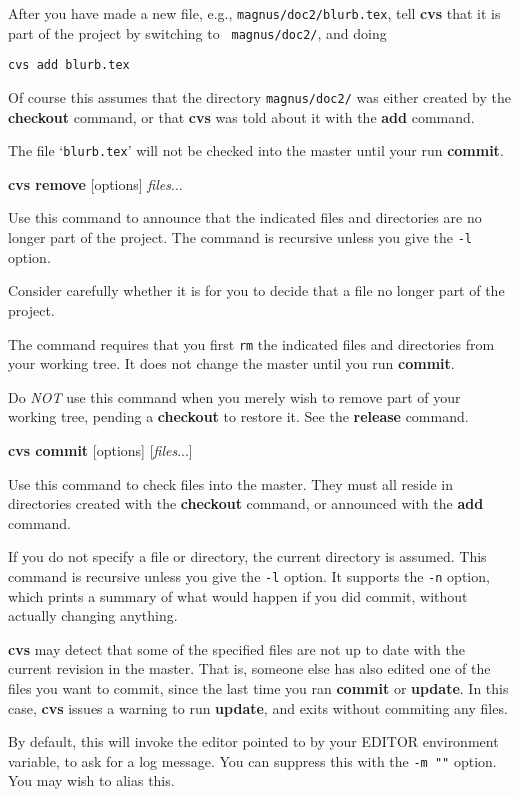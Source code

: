 \begin{description}
After you have made a new file, e.g., {\tt magnus/doc2/blurb.tex}, tell
{\bf cvs} that it is part of the project by switching to {\tt
magnus/doc2/}, and doing

\vspace{8pt}

{\tt cvs add blurb.tex}

\vspace{8pt}

Of course this assumes that the directory {\tt magnus/doc2/} was
either created by the {\bf checkout} command, or that {\bf cvs} was
told about it with the {\bf add} command.

The file `{\tt blurb.tex}' will not be checked into the master until
your run {\bf commit}.



\item{{\bf cvs remove} [options] {\em files}...}

Use this command to announce that the indicated files and directories
are no longer part of the project. The command is recursive unless you
give the {\tt -l} option.

Consider carefully whether it is for you to decide that a file no
longer part of the project.

The command requires that you first {\tt rm} the indicated files and
directories from your working tree. It does not change the master
until you run {\bf commit}.

Do {\em NOT\/} use this command when you merely wish to remove part of
your working tree, pending a {\bf checkout} to restore it. See the
{\bf release} command.



\item{{\bf cvs commit} [options] [{\em files}...]}

Use this command to check files into the master. They must all reside
in directories created with the {\bf checkout} command, or announced
with the {\bf add} command.

If you do not specify a file or directory, the current directory is
assumed. This command is recursive unless you give the {\tt -l}
option. It supports the {\tt -n} option, which prints a summary of
what would happen if you did commit, without actually changing
anything.

{\bf cvs} may detect that some of the specified files are not up to
date with the current revision in the master. That is, someone else
has also edited one of the files you want to commit, since the last
time you ran {\bf commit} or {\bf update}. In this case, {\bf cvs}
issues a warning to run {\bf update}, and exits without commiting any
files.

By default, this will invoke the editor pointed to by your EDITOR
environment variable, to ask for a log message. You can suppress this
with the {\tt -m ""} option. You may wish to alias this.


\end{description}



